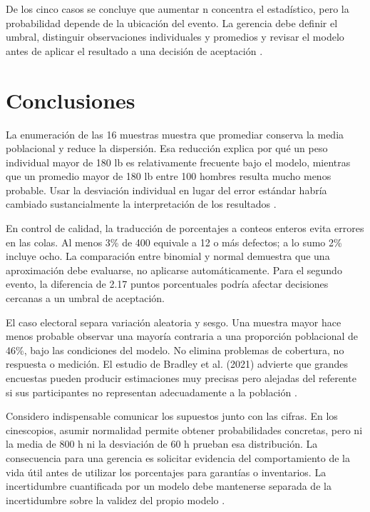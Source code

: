 {De los cinco casos se concluye que aumentar n concentra el estadístico, pero la probabilidad depende de la ubicación del evento. La gerencia debe definir el umbral, distinguir observaciones individuales y promedios y revisar el modelo antes de aplicar el resultado a una decisión de aceptación \citep{holmesBusiness2023,nistHandbook}.

\clearpage
\section{Conclusiones}
La enumeración de las 16 muestras muestra que promediar conserva la media poblacional y reduce la dispersión. Esa reducción explica por qué un peso individual mayor de 180 lb es relativamente frecuente bajo el modelo, mientras que un promedio mayor de 180 lb entre 100 hombres resulta mucho menos probable. Usar la desviación individual en lugar del error estándar habría cambiado sustancialmente la interpretación de los resultados \citep{holmesBusiness2023}.

En control de calidad, la traducción de porcentajes a conteos enteros evita errores en las colas. Al menos 3\% de 400 equivale a 12 o más defectos; a lo sumo 2\% incluye ocho. La comparación entre binomial y normal demuestra que una aproximación debe evaluarse, no aplicarse automáticamente. Para el segundo evento, la diferencia de 2.17 puntos porcentuales podría afectar decisiones cercanas a un umbral de aceptación.

El caso electoral separa variación aleatoria y sesgo. Una muestra mayor hace menos probable observar una mayoría contraria a una proporción poblacional de 46\%, bajo las condiciones del modelo. No elimina problemas de cobertura, no respuesta o medición. El estudio de Bradley et al. (2021) advierte que grandes encuestas pueden producir estimaciones muy precisas pero alejadas del referente si sus participantes no representan adecuadamente a la población \citep{bradley2021}.

Considero indispensable comunicar los supuestos junto con las cifras. En los cinescopios, asumir normalidad permite obtener probabilidades concretas, pero ni la media de 800 h ni la desviación de 60 h prueban esa distribución. La consecuencia para una gerencia es solicitar evidencia del comportamiento de la vida útil antes de utilizar los porcentajes para garantías o inventarios. La incertidumbre cuantificada por un modelo debe mantenerse separada de la incertidumbre sobre la validez del propio modelo \citep{nistHandbook}.

}
